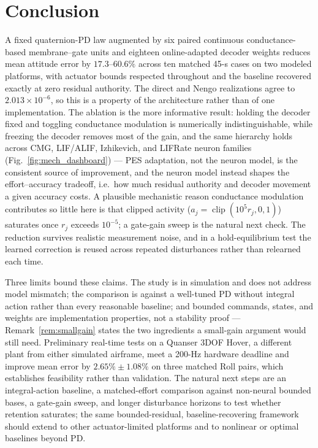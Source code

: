 \documentclass[letterpaper, 10 pt, conference]{ieeeconf}
\newcommand{\clip}{\operatorname{clip}}
\begin{document}
\section{Conclusion}
\label{sec:conclusion}
A fixed quaternion-PD law augmented by six paired continuous conductance-based
membrane--gate units and eighteen online-adapted decoder weights reduces mean
attitude error by $17.3$--$60.6\%$ across ten matched 45-s cases on two modeled
platforms, with actuator bounds respected throughout and the baseline
recovered exactly at zero residual authority. The direct and Nengo
realizations agree to $2.013\times10^{-6}$, so this is a property of the
architecture rather than of one implementation. The ablation is the more
informative result: holding the decoder fixed and toggling conductance
modulation is numerically indistinguishable, while freezing the decoder
removes most of the gain, and the same hierarchy holds across CMG, LIF/ALIF,
Izhikevich, and LIFRate neuron families (Fig.~\ref{fig:mech_dashboard}) --- PES
adaptation, not the neuron model, is the consistent source of improvement,
and the neuron model instead shapes the effort--accuracy tradeoff, i.e.\ how
much residual authority and decoder movement a given accuracy costs. A
plausible mechanistic reason conductance modulation contributes so little
here is that clipped activity ($a_j=\clip(10^5r_j,0,1)$) saturates once
$r_j$ exceeds $10^{-5}$; a gate-gain sweep is the natural next check. The
reduction survives realistic measurement noise, and in a hold-equilibrium
test the learned correction is reused across repeated disturbances rather
than relearned each time.

Three limits bound these claims. The study is in simulation and does not
address model mismatch; the comparison is against a well-tuned PD without
integral action rather than every reasonable baseline; and bounded commands,
states, and weights are implementation properties, not a stability proof ---
Remark~\ref{rem:smallgain} states the two ingredients a small-gain argument
would still need. Preliminary real-time tests on a Quanser 3DOF Hover, a
different plant from either simulated airframe, meet a 200-Hz hardware
deadline and improve mean error by $2.65\%\pm1.08\%$ on three matched Roll
pairs, which establishes feasibility rather than validation. The natural
next steps are an integral-action baseline, a matched-effort comparison
against non-neural bounded bases, a gate-gain sweep, and longer disturbance
horizons to test whether retention saturates; the same bounded-residual,
baseline-recovering framework should extend to other actuator-limited
platforms and to nonlinear or optimal baselines beyond PD.





\end{document}
